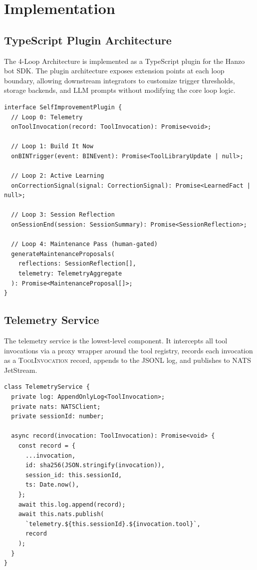 \section{Implementation}

\label{sec:implementation}

\subsection{TypeScript Plugin Architecture}

The 4-Loop Architecture is implemented as a TypeScript plugin for the Hanzo
bot SDK. The plugin architecture exposes extension points at each loop
boundary, allowing downstream integrators to customize trigger thresholds,
storage backends, and LLM prompts without modifying the core loop logic.

\begin{verbatim}
interface SelfImprovementPlugin {
  // Loop 0: Telemetry
  onToolInvocation(record: ToolInvocation): Promise<void>;

  // Loop 1: Build It Now
  onBINTrigger(event: BINEvent): Promise<ToolLibraryUpdate | null>;

  // Loop 2: Active Learning
  onCorrectionSignal(signal: CorrectionSignal): Promise<LearnedFact | null>;

  // Loop 3: Session Reflection
  onSessionEnd(session: SessionSummary): Promise<SessionReflection>;

  // Loop 4: Maintenance Pass (human-gated)
  generateMaintenanceProposals(
    reflections: SessionReflection[],
    telemetry: TelemetryAggregate
  ): Promise<MaintenanceProposal[]>;
}
\end{verbatim}

\subsection{Telemetry Service}

The telemetry service is the lowest-level component. It intercepts all tool
invocations via a proxy wrapper around the tool registry, records each
invocation as a \textsc{ToolInvocation} record, appends to the JSONL log,
and publishes to NATS JetStream.

\begin{verbatim}
class TelemetryService {
  private log: AppendOnlyLog<ToolInvocation>;
  private nats: NATSClient;
  private sessionId: number;

  async record(invocation: ToolInvocation): Promise<void> {
    const record = {
      ...invocation,
      id: sha256(JSON.stringify(invocation)),
      session_id: this.sessionId,
      ts: Date.now(),
    };
    await this.log.append(record);
    await this.nats.publish(
      `telemetry.${this.sessionId}.${invocation.tool}`,
      record
    );
  }
}
\end{verbatim}

